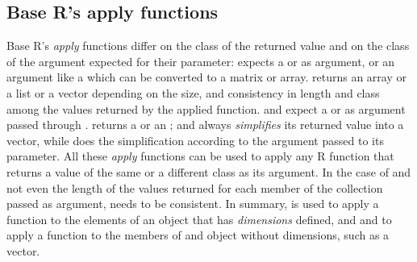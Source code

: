\documentclass[krantz2]{krantz}\usepackage{knitr}%
\begin{document}
\subsection{Base R's apply functions}

Base R's \emph{apply} functions differ on the class of the returned value and on the class of the argument expected for their  parameter:  expects a  or  as argument, or an argument like a  which can be converted to a matrix or array.  returns an array or a list or a vector depending on the size, and consistency in length and class among the values returned by the applied function.  and  expect a  or  as argument passed through .  returns a  or an ; and  always \emph{simplifies} its returned value into a vector, while  does the simplification according to the argument passed to its  parameter. All these \emph{apply} functions can be used to apply any R function that returns a value of the same or a different class as its argument. In the case of  and  not even the length of the values returned for each member of the collection passed as argument, needs to be consistent. In summary,  is used to apply a function to the elements of an object that has \emph{dimensions} defined, and  and  to apply a function to the members of and object without dimensions, such as a vector.
\end{document}
